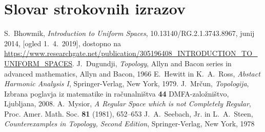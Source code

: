 \documentclass[mat1]{fmfdelo}
\begin{document}
\section*{Slovar strokovnih izrazov}


\begin{thebibliography}{99}

S.~Bhowmik, \emph{Introduction to Uniform Spaces}, 10.13140/RG.2.1.3743.8967, junij 2014, [ogled 1.~4.~2019], dostopno na \url{https://www.researchgate.net/publication/305196408_INTRODUCTION_TO_UNIFORM_SPACES}.
J.~Dugundji, \emph{Topology}, Allyn and Bacon series in advanced mathematics, Allyn and Bacon, 1966
E.~Hewitt in K.~A.~Ross, \emph{Abstact Harmonic Analysis I}, Springer-Verlag, New York, 1979.
J.~Mrčun, \emph{Topologija}, Izbrana poglavja iz matematike in računalništva \textbf{44} DMFA-založništvo, Ljubljana, 2008.
A.~Mysior, \emph{A Regular Space which is not Completely Regular}, Proc. Amer. Math. Soc. \textbf{81} (1981), 652--653
J.~A.~Seebach, Jr. in L.~A.~Steen, \emph{Counterexamples in Topology, Second Edition}, Springer-Verlag, New York, 1978

\end{thebibliography}
\end{document}
